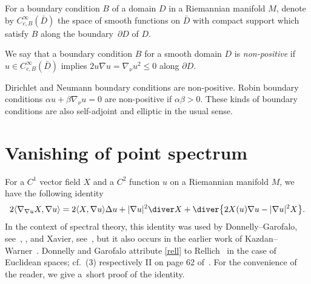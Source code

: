 For a boundary condition $B$ of a domain $D$ in a Riemannian manifold $M$,
denote by $C^\infty_{c,B}(\bar{D})$ the space of smooth functions on $\bar D$ with compact support
which satisfy $B$ along the boundary~$\partial D$ of $D$.

\begin{Definition}%
We say that a boundary condition $B$ for a smooth domain $D$ is \emph{non-positive}
if~$u\in C^\infty_{c,B}(\bar D)$ implies $2u\nabla u=\nabla_\nu u^2\le0$ along $\partial D$.
\end{Definition}

\begin{exas}
Dirichlet and Neumann boundary conditions are non-positive.
Robin boundary conditions $\alpha u+\beta\nabla_\nu u=0$ are non-positive if $\alpha\beta>0$.
These kinds of boundary conditions are also self-adjoint and elliptic in the usual sense.
\end{exas}

\section{Vanishing of point spectrum}\label{secrell}

For a $C^1$ vector field $X$ and a $C^2$ function $u$ on a Riemannian manifold $M$, we have the following identity
\begin{align}
 2\langle\nabla_{\nabla u}X,\nabla u\rangle
 = 2\langle X,\nabla u\rangle\Delta u + |\nabla u|^2\diver X + \diver\big\{2X(u)\nabla u-|\nabla u|^2X\big\}. \label{rell}
\end{align}
In the context of spectral theory, this identity was used by Donnelly--Garofalo,
see~\cite[Lemma~2.1]{DoGa92}, \cite[Proposition 3.1]{DoGa97}, and Xavier, see~\cite[identity~(1)]{Xavier1988},
but it also occurs in the earlier work of Kazdan--Warner~\cite[identity~(8.1)]{KazdanWarner74c}.
Donnelly and Garofalo attribute \eqref{rell} to Rellich~\cite{Rellich43} in the case of Euclidean spaces;
cf.~(3) respectively II on page 62 of~\cite{Rellich43}.
For the convenience of the reader, we give a~short proof of the identity.

